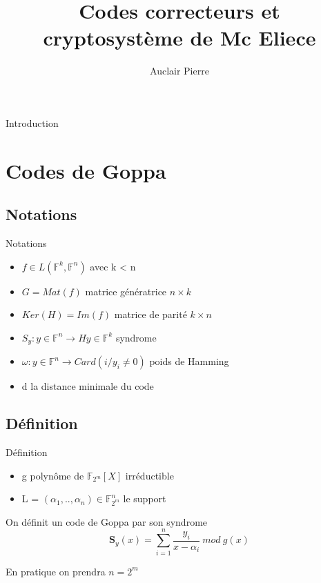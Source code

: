 \documentclass{beamer}
\title{Codes correcteurs et cryptosystème de Mc Eliece}
\author{Auclair Pierre}
\begin{document}
	\begin{frame}{Introduction}
		\tableofcontents
		
	\end{frame}

	\section{Codes de Goppa}

		\subsection{Notations}

			\begin{frame}{Notations}

				\begin{itemize}
					\item $f \in L(\mathbb{F}^{k},\mathbb{F}^{n})$ avec k < n \\
					\item $ G=Mat(f) $ matrice génératrice $n\times k$\\
					\item $Ker(H) = Im(f)$ matrice de parité $k\times n$\\
					\item $ S_{y} : y \in \mathbb{F}^{n} \rightarrow Hy \in \mathbb{F}^{k} $ syndrome \\
					\item $ \omega : y \in \mathbb{F}^{n} \rightarrow Card( i / y_{i}\neq 0 ) $ poids de Hamming
					\item d la distance minimale du code
				\end{itemize}

			\end{frame}

		\subsection{Définition}

			\begin{frame}{Définition}

				\begin{itemize}
					\item g polynôme de $ \mathbb{F}_{2^m}[X]$ irréductible
					\item L = $ (\alpha_{1},..,\alpha_{n})  \in \mathbb{F}_{2^{m}}^{n}$ le support
				\end{itemize}

				On définit un code de Goppa par son syndrome
				$$\mathbf{S}_{y}(x) = \sum_{i=1}^{n} \frac{y_{i}}{x-\alpha_{i}} \ mod \ g(x)$$

				En pratique on prendra $n = 2^{m}$

			\end{frame}
\end{document}
